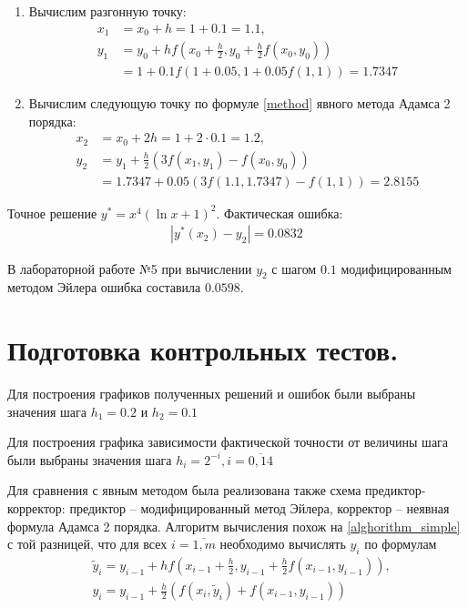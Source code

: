 \documentclass[a4paper, 12pt]{article}
\begin{document}
	\begin{enumerate}
		\item Вычислим разгонную точку:
		\begin{equation*}
			\begin{aligned}
				x_1 &= x_0 + h = 1 + 0.1 = 1.1,\\
				y_1 &= y_0 + hf(x_0 + \frac{h}{2}, y_0+\frac{h}{2}f(x_0,y_0)) \\&= 1 + 0.1f(1 + 0.05, 1 + 0.05f(1,1)) = 1.7347
			\end{aligned}
		\end{equation*}
		\item Вычислим следующую точку по формуле \eqref{method} явного метода Адамса 2 порядка:
		\begin{equation*}
			\begin{aligned}
				x_2 &= x_0 + 2h = 1 + 2\cdot0.1 = 1.2,\\
				y_2 &= y_1 + \frac{h}{2}(3f(x_1,y_1)-f(x_0,y_0)) \\&= 1.7347 + 0.05(3f(1.1,1.7347)-f(1,1)) = 2.8155
			\end{aligned}
		\end{equation*}
	\end{enumerate} 
	
	Точное решение $y^*=x^4(\ln x+1)^2$. Фактическая ошибка:
	\begin{equation*}
		\begin{gathered}
			|y^*(x_2)-y_2|=0.0832
		\end{gathered}
	\end{equation*}

	В лабораторной работе №5 при вычислении $y_2$ с шагом $0.1$ модифицированным методом Эйлера ошибка составила $0.0598$.
	
	\section{Подготовка контрольных тестов.}
	
	Для построения графиков полученных решений и ошибок были выбраны значения шага $h_1=0.2$ и $h_2=0.1$
	
	Для построения графика зависимости фактической точности от величины шага были выбраны значения шага $h_i=2^{-i}, i=\overline{0,14}$
	
	Для сравнения с явным методом была реализована также схема предиктор-корректор: предиктор -- модифицированный метод Эйлера, корректор -- неявная формула Адамса 2 порядка. Алгоритм вычисления похож на \ref{alghorithm_simple} с той разницей, что для всех $i=\overline{1,m}$ необходимо вычислять $y_i$ по формулам
	\begin{equation} \label{predcorr}
		\begin{aligned}
			&\widetilde{y}_i = y_{i-1} + hf(x_{i-1} + \frac{h}{2}, y_{i-1}+\frac{h}{2}f(x_{i-1},y_{i-1})),\\
			&y_i = y_{i-1} + \frac{h}{2}(f(x_i,\widetilde{y}_i) + f(x_{i-1}, y_{i-1}))
		\end{aligned}
	\end{equation}
	
\end{document}
